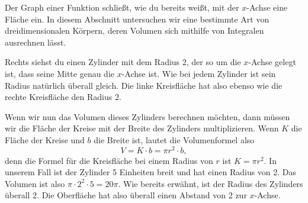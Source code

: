 \documentclass[../../main.tex]{subfiles}
\begin{document}
Der Graph einer Funktion schließt, wie du bereits weißt, mit der $x$-Achse eine Fläche ein. In diesem Abschnitt
untersuchen wir eine bestimmte Art von dreidimensionalen Körpern, deren Volumen sich mithilfe von Integralen ausrechnen
lässt.

Rechts siehst du einen Zylinder mit dem Radius 2, der so um die $x$-Achse gelegt ist, dass seine Mitte genau die 
$x$-Achse ist. Wie bei jedem Zylinder ist sein Radius natürlich überall gleich. Die linke Kreisfläche hat also ebenso
wie die rechte Kreisfläche den Radius 2.

Wenn wir nun das Volumen dieses Zylinders berechnen möchten, dann müssen wir die Fläche der Kreise mit der Breite des
Zylinders multiplizieren. Wenn $K$ die Fläche der Kreise und $b$ die Breite ist, lautet die Volumenformel also
\[V=K\cdot b=\pi r^2\cdot b,\]
denn die Formel für die Kreisfläche bei einem Radius von $r$ ist $K=\pi r^2$. In unserem Fall ist der Zylinder 5 Einheiten
breit und hat einen Radius von 2. Das Volumen ist also $\pi\cdot 2^2\cdot 5=20\pi$.
Wie bereits erwähnt, ist der Radius des Zylinders überall 2. Die Oberfläche hat also überall einen Abstand von 2 zur
$x$-Achse. 
\end{document}
